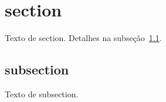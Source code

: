\documentclass{article}
\begin{document}
\section{section}
\label{sec:section}

Texto de section. Detalhes na subseção~\ref{ssec:subsection}.

\subsection{subsection}
\label{ssec:subsection}

Texto de subsection.
	
\end{document}
